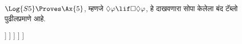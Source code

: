 \begin{ex}
  $\Log{S5} \Proves \Ax{5}$, म्हणजे
  $\Diamond\varphi \lif \Box\Diamond\varphi$, हे दाखवणारा
  सोपा केलेला बंद टॅब्लो पुढीलप्रमाणे आहे.
  \begin{oltableau}
    [\pFmla{\False}{\Diamond\formula{A} \lif \Box\Diamond \formula{A}}{1},
      just = \TAss
      [\pFmla{\True}{\Diamond \formula{A}}{1}, just = {\TRule{\False}{\lif}[1]}
        [\pFmla{\False}{\Box\Diamond \formula{A}}{1},
          just = {\TRule{\False}{\lif}[1]}
          [\pFmla{\False}{\Diamond \formula{A}}{2},
            just = {\TRule{\False}{\Box}[3]}
            [\pFmla{\True}{\formula{A}}{3},
              just = {\TRule{\True}{\Diamond}[2]}
                [\pFmla{\False}{\formula{A}}{3},
                  just = {\TRule{\False}{\Diamond}[4]}, close]
            ]
          ]
        ]
      ]
    ]
  \end{oltableau}
\end{ex}
